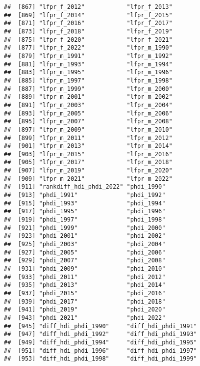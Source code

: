 \documentclass[
]{article}
\begin{document}
\begin{verbatim}
##  [867] "lfpr_f_2012"            "lfpr_f_2013"           
##  [869] "lfpr_f_2014"            "lfpr_f_2015"           
##  [871] "lfpr_f_2016"            "lfpr_f_2017"           
##  [873] "lfpr_f_2018"            "lfpr_f_2019"           
##  [875] "lfpr_f_2020"            "lfpr_f_2021"           
##  [877] "lfpr_f_2022"            "lfpr_m_1990"           
##  [879] "lfpr_m_1991"            "lfpr_m_1992"           
##  [881] "lfpr_m_1993"            "lfpr_m_1994"           
##  [883] "lfpr_m_1995"            "lfpr_m_1996"           
##  [885] "lfpr_m_1997"            "lfpr_m_1998"           
##  [887] "lfpr_m_1999"            "lfpr_m_2000"           
##  [889] "lfpr_m_2001"            "lfpr_m_2002"           
##  [891] "lfpr_m_2003"            "lfpr_m_2004"           
##  [893] "lfpr_m_2005"            "lfpr_m_2006"           
##  [895] "lfpr_m_2007"            "lfpr_m_2008"           
##  [897] "lfpr_m_2009"            "lfpr_m_2010"           
##  [899] "lfpr_m_2011"            "lfpr_m_2012"           
##  [901] "lfpr_m_2013"            "lfpr_m_2014"           
##  [903] "lfpr_m_2015"            "lfpr_m_2016"           
##  [905] "lfpr_m_2017"            "lfpr_m_2018"           
##  [907] "lfpr_m_2019"            "lfpr_m_2020"           
##  [909] "lfpr_m_2021"            "lfpr_m_2022"           
##  [911] "rankdiff_hdi_phdi_2022" "phdi_1990"             
##  [913] "phdi_1991"              "phdi_1992"             
##  [915] "phdi_1993"              "phdi_1994"             
##  [917] "phdi_1995"              "phdi_1996"             
##  [919] "phdi_1997"              "phdi_1998"             
##  [921] "phdi_1999"              "phdi_2000"             
##  [923] "phdi_2001"              "phdi_2002"             
##  [925] "phdi_2003"              "phdi_2004"             
##  [927] "phdi_2005"              "phdi_2006"             
##  [929] "phdi_2007"              "phdi_2008"             
##  [931] "phdi_2009"              "phdi_2010"             
##  [933] "phdi_2011"              "phdi_2012"             
##  [935] "phdi_2013"              "phdi_2014"             
##  [937] "phdi_2015"              "phdi_2016"             
##  [939] "phdi_2017"              "phdi_2018"             
##  [941] "phdi_2019"              "phdi_2020"             
##  [943] "phdi_2021"              "phdi_2022"             
##  [945] "diff_hdi_phdi_1990"     "diff_hdi_phdi_1991"    
##  [947] "diff_hdi_phdi_1992"     "diff_hdi_phdi_1993"    
##  [949] "diff_hdi_phdi_1994"     "diff_hdi_phdi_1995"    
##  [951] "diff_hdi_phdi_1996"     "diff_hdi_phdi_1997"    
##  [953] "diff_hdi_phdi_1998"     "diff_hdi_phdi_1999"    

\end{verbatim}
\end{document}
